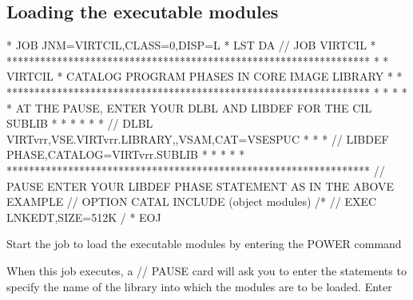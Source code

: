 \documentclass[letterpaper,10pt,english]{sphinxmanual}
\begin{document}
\subsection{Loading the executable modules}
\label{\detokenize{Installation_Guide:loading-the-executable-modules}}
\begin{sphinxVerbatim}[commandchars=\\\{\}]
* \PYGZdl{}\PYGZdl{} JOB JNM=VIRTCIL,CLASS=0,DISP=L
* \PYGZdl{}\PYGZdl{} LST DA
// JOB VIRTCIL
* *****************************************************************
* * VIRTCIL * CATALOG PROGRAM PHASES IN CORE IMAGE LIBRARY        *
* *****************************************************************
* *                                                               *
* * AT THE PAUSE, ENTER YOUR DLBL AND LIBDEF FOR THE CIL SUBLIB   *
* *                                                               *
* * // DLBL VIRTvrr,\PYGZsq{}VSE.VIRTvrr.LIBRARY\PYGZsq{},,VSAM,CAT=VSESPUC       *
* * // LIBDEF PHASE,CATALOG=VIRTvrr.SUBLIB                        *
* *                                                               *
* *****************************************************************
// PAUSE ENTER YOUR LIBDEF PHASE STATEMENT AS IN THE ABOVE EXAMPLE
// OPTION CATAL
        INCLUDE
        (object modules)
/*
// EXEC LNKEDT,SIZE=512K
/\PYGZam{}
* \PYGZdl{}\PYGZdl{} EOJ
\end{sphinxVerbatim}

\sphinxAtStartPar
{}

\sphinxAtStartPar
Start the job to load the executable modules by entering the POWER command

\begin{sphinxVerbatim}[commandchars=\\\{\}]
 
\end{sphinxVerbatim}

\sphinxAtStartPar
When this job executes, a // PAUSE card will ask you to enter the statements to specify the name of the library into which the modules are to be loaded. Enter

\begin{sphinxVerbatim}[commandchars=\\\{\}]
  
  
\end{sphinxVerbatim}
\end{document}
